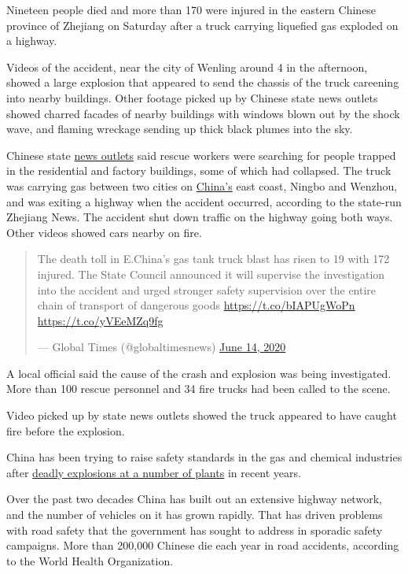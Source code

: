 Nineteen people died and more than 170 were injured in the eastern
Chinese province of Zhejiang on Saturday after a truck carrying
liquefied gas exploded on a highway.

Videos of the accident, near the city of Wenling around 4 in the
afternoon, showed a large explosion that appeared to send the chassis of
the truck careening into nearby buildings. Other footage picked up by
Chinese state news outlets showed charred facades of nearby buildings
with windows blown out by the shock wave, and flaming wreckage sending
up thick black plumes into the sky.

Chinese state
\href{https://twitter.com/XHNews/status/1271797616599154688}{news
outlets} said rescue workers were searching for people trapped in the
residential and factory buildings, some of which had collapsed. The
truck was carrying gas between two cities on
\href{https://www.nytimes.com/2020/06/17/world/asia/China-DNA-surveillance.html}{China's}
east coast, Ningbo and Wenzhou, and was exiting a highway when the
accident occurred, according to the state-run Zhejiang News. The
accident shut down traffic on the highway going both ways. Other videos
showed cars nearby on fire.

\begin{quote}
The death toll in E.China's gas tank truck blast has risen to 19 with
172 injured. The State Council announced it will supervise the
investigation into the accident and urged stronger safety supervision
over the entire chain of transport of dangerous goods
\url{https://t.co/bIAPUgWoPn} \url{https://t.co/yVEeMZq9fg}

--- Global Times (@globaltimesnews)
\href{https://twitter.com/globaltimesnews/status/1272021042374930432?ref_src=twsrc\%5Etfw}{June
14, 2020}
\end{quote}

A local official said the cause of the crash and explosion was being
investigated. More than 100 rescue personnel and 34 fire trucks had been
called to the scene.

Video picked up by state news outlets showed the truck appeared to have
caught fire before the explosion.

China has been trying to raise safety standards in the gas and chemical
industries after
\href{https://www.nytimes.com/2015/08/31/world/asia/behind-tianjin-tragedy-a-company-that-flouted-regulations-and-reaped-profits.html}{deadly
explosions at a number of plants} in recent years.

Over the past two decades China has built out an extensive highway
network, and the number of vehicles on it has grown rapidly. That has
driven problems with road safety that the government has sought to
address in sporadic safety campaigns. More than 200,000 Chinese die each
year in road accidents, according to the World Health Organization.


